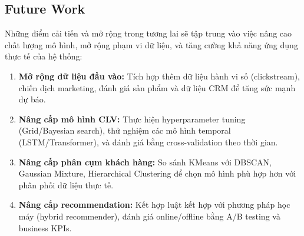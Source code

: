 \documentclass[a4paper,12pt]{article}
\begin{document}
\subsection{Future Work}
Những điểm cải tiến và mở rộng trong tương lai sẽ tập trung vào việc nâng cao chất lượng mô hình, mở rộng phạm vi dữ liệu, và tăng cường khả năng ứng dụng thực tế của hệ thống:
\begin{enumerate}
    \item \textbf{Mở rộng dữ liệu đầu vào:} Tích hợp thêm dữ liệu hành vi số (clickstream), chiến dịch marketing, đánh giá sản phẩm và dữ liệu CRM để tăng sức mạnh dự báo.
    \item \textbf{Nâng cấp mô hình CLV:} Thực hiện hyperparameter tuning (Grid/Bayesian search), thử nghiệm các mô hình temporal (LSTM/Transformer), và đánh giá bằng cross-validation theo thời gian.
    \item \textbf{Nâng cấp phân cụm khách hàng:} So sánh KMeans với DBSCAN, Gaussian Mixture, Hierarchical Clustering để chọn mô hình phù hợp hơn với phân phối dữ liệu thực tế.
    \item \textbf{Nâng cấp recommendation:} Kết hợp luật kết hợp với phương pháp học máy (hybrid recommender), đánh giá online/offline bằng A/B testing và business KPIs.
\end{enumerate}
\end{document}
